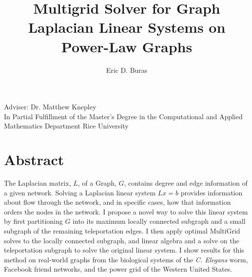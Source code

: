 \documentclass{article}
\begin{document}
\title{Multigrid Solver for Graph Laplacian Linear Systems on Power-Law Graphs}
\author{Eric D. Buras}


\maketitle
\begin{center}
Adviser: Dr. Matthew Knepley\\
In Partial Fulfillment of the Master's Degree in the Computational and Applied Mathematics Department Rice University\\
\end{center}
\vspace{15 mm}
\section{Abstract}
The Laplacian matrix, $L$, of a Graph, $G$, contains degree and edge information of a given network. Solving a Laplacian linear system $Lx = b$ provides information about flow through the network, and in specific cases, how that information orders the nodes in the network. I propose a novel way to solve this linear system by first partitioning $G$ into its maximum locally connected subgraph and a small subgraph of the remaining teleportation edges. I then apply optimal MultiGrid solves to the locally connected subgraph, and linear algebra and a solve on the teleportation subgraph to solve the original linear system. I show results for this method on real-world graphs from the biological systems of the \textit{C. Elegans} worm, Facebook friend networks, and the power grid of the Western United States.

%
%
\end{document}
